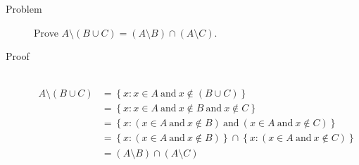 \begin{description}
\item[Problem]
Prove $A \setminus (B \cup C) = (A \setminus B) \cap (A \setminus C)$.

\item[Proof]~\\
\begin{equation*}
\begin{aligned}
A \setminus (B \cup C)
                 &= \left\{ x : x \in A\ \text{and}\ x \not \in (B \cup C)
                    \right\} \\
                 &= \left\{ x : x \in A\ \text{and}\ x \not \in B\ 
                    \text{and}\ x \not \in C\right\} \\
                 &= \left\{ x : (x \in A\ \text{and}\ x \not \in B)\ 
                    \text{and}\ (x \in A\ \text{and}\ x \not \in C)\right\} \\
                 &= \left\{ x : (x \in A\ \text{and}\ x \not \in B)\right\}
                    \cap
                    \left\{ x : (x \in A\ \text{and}\ x \not \in C)\right\} \\
                 &= (A \setminus B) \cap (A \setminus C)
\end{aligned}
\end{equation*}

\end{description}

